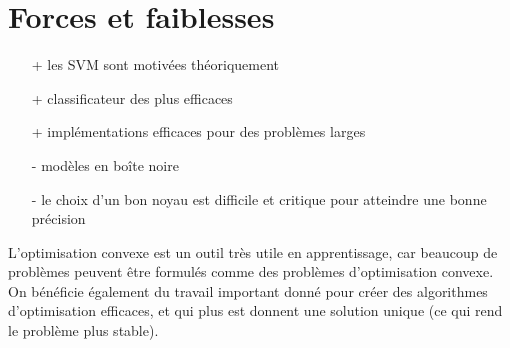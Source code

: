 \section{Forces et faiblesses}

\begin{itemize}
	\item[+] les SVM sont motivées théoriquement
	\item[+] classificateur des plus efficaces
	\item[+] implémentations efficaces pour des problèmes larges
	\item[-] modèles en boîte noire
	\item[-] le choix d'un bon noyau est difficile et critique pour atteindre une bonne précision
\end{itemize}

L'optimisation convexe est un outil très utile en apprentissage, car beaucoup de problèmes peuvent être formulés comme des problèmes d'optimisation convexe. On bénéficie également du travail important donné pour créer des algorithmes d'optimisation efficaces, et qui plus est donnent une solution unique (ce qui rend le problème plus stable).